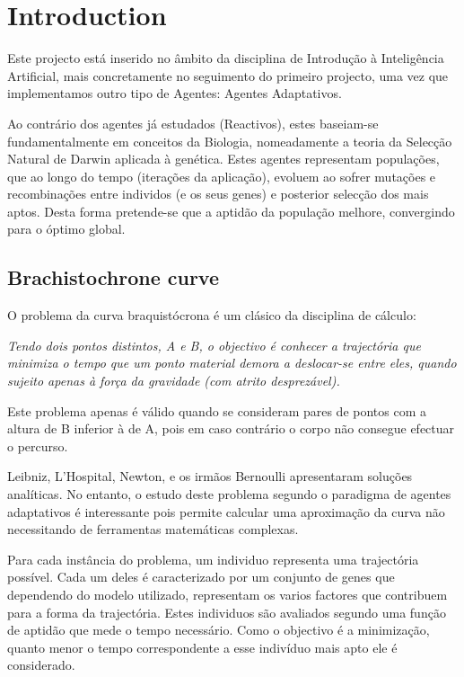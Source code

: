 \documentclass[a4paper]{article}
\title{\documentTitle}
\author{\documentAuthors{}}
\begin{document}
\renewcommand{\figurename}{Figure}
\maketitle
\cleardoublepage

\tableofcontents
\cleardoublepage

\setlength{\parindent}{1cm}
\setlength{\parskip}{0.3cm}

\section{Introduction}
\indent \indent Este projecto está inserido no âmbito da disciplina de Introdução à Inteligência Artificial,
mais concretamente no seguimento do primeiro projecto, uma vez que implementamos outro tipo de Agentes: Agentes Adaptativos.

Ao contrário dos agentes já estudados (Reactivos), estes baseiam-se fundamentalmente em conceitos da Biologia, nomeadamente a teoria da Selecção Natural de Darwin aplicada à genética.
Estes agentes representam populações, que ao longo do tempo (iterações da aplicação), evoluem ao sofrer mutações e recombinações entre individos (e os seus genes) e posterior selecção dos mais aptos.
Desta forma pretende-se que a aptidão da população melhore, convergindo para o óptimo global.

\subsection{Brachistochrone curve}
\indent \indent O problema da curva braquistócrona é um clásico da disciplina de cálculo:

\emph{Tendo dois pontos distintos, A e B, o objectivo é conhecer a trajectória que minimiza o tempo que um ponto material demora a deslocar-se entre eles, quando sujeito apenas à força da gravidade (com atrito desprezável).}

\indent Este problema apenas é válido quando se consideram pares de pontos com a altura de B inferior à de A, pois em caso contrário o corpo não consegue efectuar o percurso.

Leibniz, L'Hospital, Newton, e os irmãos Bernoulli apresentaram soluções analíticas.
No entanto, o estudo deste problema segundo o paradigma de agentes adaptativos é interessante pois permite calcular uma aproximação da curva
não necessitando de ferramentas matemáticas complexas.

\indent Para cada instância do problema, um individuo representa uma trajectória possível. Cada um deles é caracterizado por um conjunto de genes
que dependendo do modelo utilizado, representam os varios factores que contribuem para a forma da trajectória. Estes individuos são avaliados segundo uma
função de aptidão que mede o tempo necessário. Como o objectivo é a minimização, quanto menor o tempo correspondente a esse indivíduo mais apto ele é considerado. 
\end{document}
